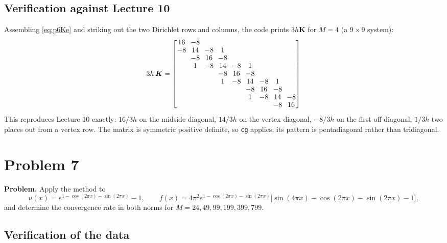 \documentclass[11pt]{article}
\newcommand{\Kmat}{\bm{K}}
\begin{document}
\subsection*{Verification against Lecture 10}

Assembling \eqref{eq:p6Ke} and striking out the two Dirichlet rows and columns,
the code prints $3h\Kmat$ for $M=4$ (a $9\times9$ system):
\begin{equation}\label{eq:p6assembled}
  3h\,\Kmat=
  \setlength{\arraycolsep}{3.2pt}
  \renewcommand{\arraystretch}{0.92}
  \begin{bmatrix}
   16 & -8 &    &    &    &    &    &    &   \\
   -8 & 14 & -8 &  1 &    &    &    &    &   \\
      & -8 & 16 & -8 &    &    &    &    &   \\
      &  1 & -8 & 14 & -8 &  1 &    &    &   \\
      &    &    & -8 & 16 & -8 &    &    &   \\
      &    &    &  1 & -8 & 14 & -8 &  1 &   \\
      &    &    &    &    & -8 & 16 & -8 &   \\
      &    &    &    &    &  1 & -8 & 14 & -8\\
      &    &    &    &    &    &    & -8 & 16
  \end{bmatrix}
\end{equation}
This reproduces Lecture 10 exactly: $16/3h$ on the midside diagonal, $14/3h$ on
the vertex diagonal, $-8/3h$ on the first off-diagonal, $1/3h$ two places out
from a vertex row. The matrix is symmetric positive definite, so \texttt{cg}
applies; its pattern is pentadiagonal rather than tridiagonal.

\clearpage
\section*{Problem 7}

\textbf{Problem.} Apply the method to
\[
  u(x)=e^{1-\cos(2\pi x)-\sin(2\pi x)}-1,\qquad
  f(x)=4\pi^{2}e^{1-\cos(2\pi x)-\sin(2\pi x)}
       \bigl[\sin(4\pi x)-\cos(2\pi x)-\sin(2\pi x)-1\bigr],
\]
and determine the convergence rate in both norms for
$M=24,49,99,199,399,799$.

\subsection*{Verification of the data}
\end{document}
